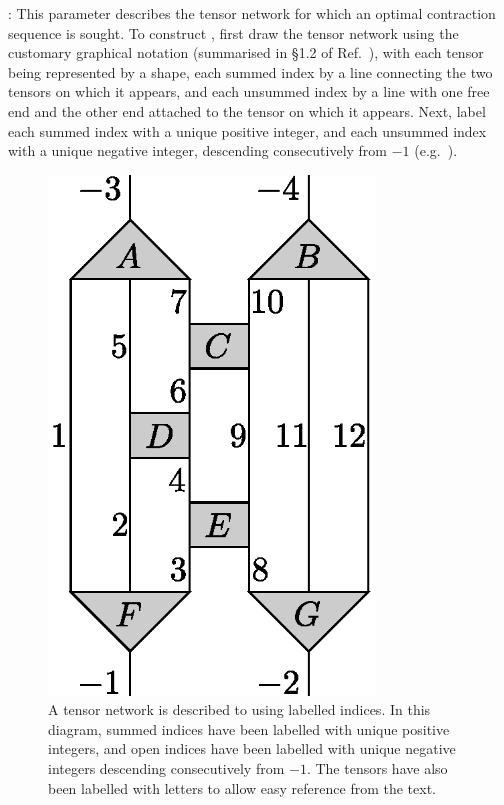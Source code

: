 : This parameter describes the tensor network for which an optimal contraction sequence is sought. To construct , first draw the tensor network using the customary graphical notation (summarised in \S{}1.2 of Ref.~), with each tensor being represented by a shape, each summed index by a line connecting the two tensors on which it appears, and each unsummed index by a line with one free end and the other end attached to the tensor on which it appears.
Next, label each summed index with a unique positive integer, and each unsummed index with a unique negative integer, descending consecutively from $-1$ (e.g.~). 
\begin{figure}
\includegraphics[width=246.0pt]{labelled31MERA}
\caption{\label{fig:labelled31MERA}A tensor network is described to  using labelled indices. In this diagram, summed indices have been labelled with unique positive integers, and open indices have been labelled with unique negative integers descending consecutively from $-1$. The tensors have also been labelled with letters to allow easy reference from the text.}
\end{figure}%
